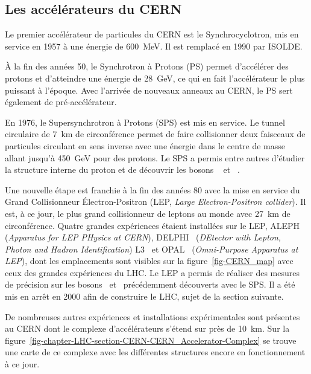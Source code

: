 \subsection{Les accélérateurs du CERN}
Le premier accélérateur de particules du CERN est le Synchrocyclotron, mis en service en 1957 à une énergie de \SI{600}{\MeV}.
Il est remplacé en 1990 par ISOLDE.
\par À la fin des années 50, le Synchrotron à Protons (PS) permet d'accélérer des protons et d'atteindre une énergie de \SI{28}{\GeV}, ce qui en fait l'accélérateur le plus puissant à l'époque.
Avec l'arrivée de nouveaux anneaux au CERN, le PS sert également de pré-accélérateur.
\par En 1976, le Supersynchrotron à Protons (SPS) est mis en service.
Le tunnel circulaire de \SI{7}{\kilo\meter} de circonférence permet de faire collisionner deux faisceaux de particules circulant en sens inverse avec une énergie dans le centre de masse allant jusqu'à \SI{450}{\GeV} pour des protons.
Le SPS a permis entre autres d'étudier la structure interne du proton et de découvrir les bosons
\Wboson~\cite{Wboson_discovery1,Wboson_discovery2,Wboson_discovery3}
et
\Zboson~\cite{Zboson_discovery1,Zboson_discovery2}.
\par Une nouvelle étape est franchie à la fin des années 80 avec la mise en service du Grand Collisionneur Électron-Positron (LEP, \emph{Large Electron-Positron collider}).
Il est, à ce jour, le plus grand collisionneur de leptons au monde avec \SI{27}{\kilo\meter} de circonférence.
Quatre grandes expériences étaient installées sur le LEP,
ALEPH~\cite{aleph_paper} (\emph{Apparatus for LEP PHysics at CERN}), 
DELPHI~\cite{delphi_paper} (\emph{DEtector with Lepton, Photon and Hadron Identification})
L3~\cite{l3_paper} et
OPAL~\cite{opal_paper} (\emph{Omni-Purpose Apparatus at LEP}),
dont les emplacements sont visibles sur la figure~\ref{fig-CERN_map} avec ceux des grandes expériences du LHC.
Le LEP a permis de réaliser des mesures de précision sur les bosons \Wboson\ et \Zboson\ précédemment découverts avec le SPS.
Il a été mis en arrêt en 2000 afin de construire le LHC, sujet de la section suivante.
\par De nombreuses autres expériences et installations expérimentales sont présentes au CERN dont le complexe d'accélérateurs s'étend sur près de \SI{10}{\kilo\meter}.
Sur la figure~\ref{fig-chapter-LHC-section-CERN-CERN_Accelerator-Complex} se trouve une carte de ce complexe avec les différentes structures encore en fonctionnement à ce jour.
